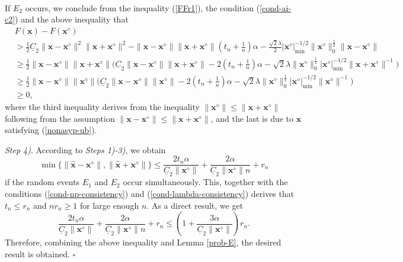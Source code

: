 \documentclass[10pt,a4paper]{amsart}
\newenvironment{proof}{{\noindent\bf Proof.}\,}{\hfill $\square$\par\mbox{}}
\begin{document}
\begin{proof}
	

	If $E_2$ occurs, we conclude from the inequality (\ref{FFr1}), the condition (\ref{cond-ai-c2}) and the above inequality that
	\begin{equation}
		\begin{aligned}
			&F(\mathbf{x})-F(\mathbf{x}^\diamond)\\
			&>\frac{1}{2}\underline{C}_2\|\mathbf{x}-\mathbf{x}^\diamond\|^2\|\mathbf{x}+\mathbf{x}^\diamond\|^2-\|\mathbf{x}-\mathbf{x}^\diamond\|\|\mathbf{x}+\mathbf{x}^\diamond\|(t_n+\frac{1}{n})\alpha
			-\frac{\sqrt{2}\lambda}{2}|\mathbf{x}^\diamond|_{\mathrm{min}}^{-1/2}\|\mathbf{x}^\diamond\|_0^{\frac{1}{2}}\|\mathbf{x}-\mathbf{x}^\diamond\|\\
			&\geq\frac{1}{2}\|\mathbf{x}-\mathbf{x}^\diamond\|\|\mathbf{x}+\mathbf{x}^\diamond\|\Big(\underline{C}_2\|\mathbf{x}-\mathbf{x}^\diamond\|\|\mathbf{x}+\mathbf{x}^\diamond\|
			-2(t_n+\frac{1}{n})\alpha
			-\sqrt{2}\lambda\|\mathbf{x}^\diamond\|_0^{\frac{1}{2}}|\mathbf{x}^\diamond|_{\mathrm{min}}^{-1/2}
			\|\mathbf{x}+\mathbf{x}^\diamond\|^{-1}\Big)\\
			&\geq\frac{1}{2}\|\mathbf{x}-\mathbf{x}^\diamond\|\|\mathbf{x}^\diamond\|\Big(\underline{C}_2\|\mathbf{x}-\mathbf{x}^\diamond\|\|\mathbf{x}^\diamond\|-2(t_n+\frac{1}{n})\alpha
			-\sqrt{2}\lambda\|\mathbf{x}^\diamond\|_0^{\frac{1}{2}}|\mathbf{x}^\diamond|_{\mathrm{min}}^{-1/2}\|\mathbf{x}^\diamond\|^{-1}
			\Big)\\
			&\geq 0,
		\end{aligned}\nonumber
	\end{equation}
	where the third inequality derives from the inequality $\|\mathbf{x}^\diamond\|\leq\|\mathbf{x}+\mathbf{x}^\diamond\|$ following from the assumption $\|\mathbf{x}-\mathbf{x}^\diamond\|\leq\|\mathbf{x}+\mathbf{x}^\diamond\|$, and the last is due to  $\mathbf{x}$ satisfying (\ref{nonasyp-ub}).

	
	
		\textit{Step 4)}. According to  \textit{Steps 1)-3)},  we obtain  
	$$\min\{\|\hat{\mathbf{x}}-\mathbf{x}^\diamond\|, \|\hat{\mathbf{x}}+\mathbf{x}^\diamond\|\}\leq\frac{2t_n\alpha}{\underline{C}_2\|\mathbf{x}^\diamond\|}+\frac{2\alpha}{\underline{C}_2\|\mathbf{x}^\diamond\|n}
	+r_n$$
	if the random events $E_1$ and $E_2$ occur simultaneously. 
This, together with the conditions (\ref{cond-np-consistency}) and (\ref{cond-lambda-consistency}) derives that $t_n\leq r_n$ and $nr_n\geq1$ for large enough $n$. As a direct result, we get 
	$$\frac{2t_n\alpha}{\underline{C}_2\|\mathbf{x}^\diamond\|}+\frac{2\alpha}{\underline{C}_2\|\mathbf{x}^\diamond\|n}
	+r_n\leq(1+\frac{3\alpha}{\underline{C}_2\|\mathbf{x}^\diamond\|})r_n.$$
Therefore, combining the above inequality and Lemma \ref{prob-E}, the desired result is obtained.
\end{proof}
\end{document}
